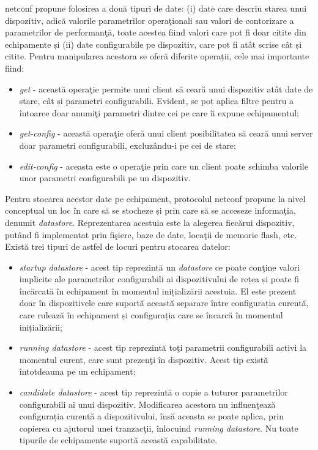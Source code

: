 \gls{netconf} propune folosirea a două tipuri de date: (i) date care descriu starea unui dispozitiv, adică valorile parametrilor operaţionali sau valori de contorizare a parametrilor de performanţă, toate acestea fiind valori care pot fi doar citite din echipamente și (ii) date configurabile pe dispozitiv, care pot fi atât scrise cât și citite. Pentru manipularea acestora se oferă diferite operații, cele mai importante fiind:

\begin{itemize}
	\item \textit{get} - această operaţie permite unui client să ceară unui dispozitiv atât date de stare, cât și parametri configurabili. Evident, se pot aplica filtre pentru a întoarce doar anumiţi parametri dintre cei pe care îi expune echipamentul;
	\item \textit{get-config} - această operaţie oferă unui client posibilitatea să ceară unui server doar parametri configurabili, excluzându-i pe cei de stare;
	\item \textit{edit-config} - aceasta este o operaţie prin care un client poate schimba valorile unor parametri configurabili pe un dispozitiv.
\end{itemize}

Pentru stocarea acestor date pe echipament, protocolul \gls{netconf} propune la nivel conceptual un loc în care să se stocheze și prin care să se acceseze informaţia, denumit \textit{datastore}. Reprezentarea acestuia este la alegerea fiecărui dispozitiv, putând fi implementat prin fişiere, baze de date, locaţii de memorie flash, etc. Există trei tipuri de astfel de locuri pentru stocarea datelor:

\begin{itemize}
	\item \textit{startup datastore} - acest tip reprezintă un \textit{datastore} ce poate conţine valori implicite ale parametrilor configurabili ai dispozitivului de rețea și poate fi încărcată în echipament în momentul inițializării acestuia. El este prezent doar în dispozitivele care suportă această separare între configurația curentă, care rulează în echipament și configurația care se încarcă în momentul inițializării;
	\item \textit{running datastore} - acest tip reprezintă toţi parametrii configurabili activi la momentul curent, care sunt prezenţi în dispozitiv. Acest tip există întotdeauna pe un echipament;
	\item \textit{candidate datastore} - acest tip reprezintă o copie a tuturor parametrilor configurabili ai unui dispozitiv. Modificarea acestora nu influenţează configurația curentă a dispozitivului, însă aceasta se poate aplica, prin copierea cu ajutorul unei tranzacţii, înlocuind \textit{running datastore}. Nu toate tipurile de echipamente suportă această capabilitate.
\end{itemize}

